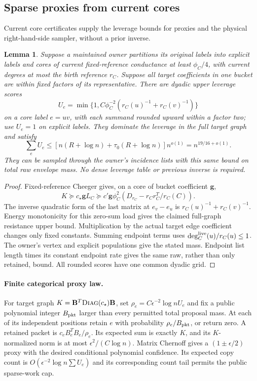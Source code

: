 \documentclass[11pt]{article}
\newtheorem{lemma}[theorem]{Lemma}
\theoremstyle{remark}
\newcommand{\BB}{\mathbf B}
\renewcommand{\gg}{\mathbf g}
\newcommand{\diag}{\textsc{Diag}}
\begin{document}
\subsection{Sparse proxies from current cores}

Current core certificates supply the leverage bounds for proxies and the
physical right-hand-side sampler, without a prior inverse.

\begin{lemma}
\label{lem:ram27-upper-scores}
Suppose a maintained owner partitions its original labels into explicit labels
and cores of current fixed-reference conductance at least $\phi_C/4$, with
current degrees at most the birth reference $r_C$.
Suppose all target coefficients in one bucket are within fixed factors of its
representative.
There are dyadic upper leverage scores
\[
 U_e=\min\{1,C\phi_C^{-2}(r_C(u)^{-1}+r_C(v)^{-1})\}
\]
on a core label $e=uv$, with each summand rounded upward within a factor two;
use $U_e=1$ on explicit labels.
They dominate the leverage in the full target graph and satisfy
\[
 \sum_eU_e\le
 [n(R+\log n)+\tau_0(R+\log n)]n^{o(1)}
              =n^{19/16+o(1)}.
\]
They can be sampled through the owner's incidence lists with this same bound on
total raw envelope mass.
No dense leverage table or previous inverse is required.
\end{lemma} \begin{proof} Fixed-reference Cheeger gives, on a core of bucket
coefficient $\gg$,
\[
 K\succeq c_\star \gg L_C\succeq c'\gg\phi_C^2
       (D_{r_C}-r_Cr_C^T/r_C(C)).
\]
The inverse quadratic form of the last matrix at $e_v-e_u$ is
$r_C(u)^{-1}+r_C(v)^{-1}$.
Energy monotonicity for this zero-sum load gives the claimed full-graph
resistance upper bound.
Multiplication by the actual target edge coefficient changes only fixed
constants.
Summing endpoint terms uses $\deg_C^{\rm live}(u)/r_C(u)\le1$.
The owner's vertex and explicit populations give the stated mass.
Endpoint list length times its constant endpoint rate gives the same raw, rather
than only retained, bound.
All rounded scores have one common dyadic grid.
\end{proof}

\paragraph{Finite categorical proxy law.}\label{par:ram30-categorical}
For target graph $K=\BB^T\diag(c_\star)\BB$, set $\rho_e=C\epsilon^{-2}\log nU_e$ and fix a
public polynomial integer $B_{\rm pkt}$ larger than every permitted total
proposal mass.
At each of its independent positions retain $e$ with probability $\rho_e/B_{\rm
pkt}$, or return zero.
A retained packet is $c_eB_e^TB_e/\rho_e$.
Its expected sum is exactly $K$, and its $K$-normalized norm is at most
$\epsilon^2/(C\log n)$.
Matrix Chernoff gives a $(1\pm\epsilon/2)$ proxy with the desired conditional
polynomial confidence.
Its expected copy count is $O(\epsilon^{-2}\log n\sum U_e)$ and its corresponding
count tail permits the public sparse-work cap.
\end{document}
